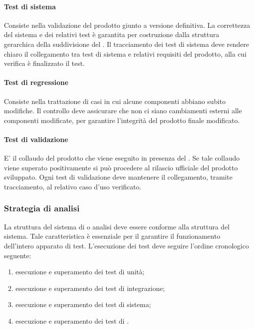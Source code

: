 \documentclass[12pt,a4paper]{article}
\begin{document}
	\paragraph{Test di sistema}
	Consiste nella validazione del prodotto giunto a versione definitiva. La correttezza del sistema e dei relativi test è garantita per costruzione dalla struttura gerarchica della suddivisione del . Il tracciamento dei test di sistema deve rendere chiaro il collegamento tra test di sistema e relativi requisiti del prodotto, alla cui verifica è finalizzato il test.
	\paragraph{Test di regressione}
	Consiste nella trattazione di casi in cui alcune componenti abbiano subito modifiche. Il controllo deve assicurare che non ci siano cambiamenti esterni alle componenti modificate, per garantire l'integrità del prodotto finale modificato.
	
	\paragraph{Test di validazione}
	E' il collaudo del prodotto  che viene eseguito in presenza del . Se tale collaudo viene superato positivamente si può procedere al rilascio ufficiale del prodotto sviluppato. 
	Ogni test di validazione deve mantenere il collegamento, tramite tracciamento, al relativo caso d'uso verificato.
	
	\subsubsection{Strategia di analisi}
	La struttura del sistema di  o analisi deve essere conforme alla struttura del sistema. Tale caratteristica è essenziale per il garantire il funzionamento dell'intero apparato di test. L'esecuzione dei test deve seguire l'ordine cronologico seguente:
	
	\begin{enumerate}
		\item esecuzione e superamento dei test di unità;
		\item esecuzione e superamento dei test di integrazione;
		\item esecuzione e superamento dei test di sistema;
		\item esecuzione e superamento dei test di .
	\end{enumerate}
	
\end{document}
